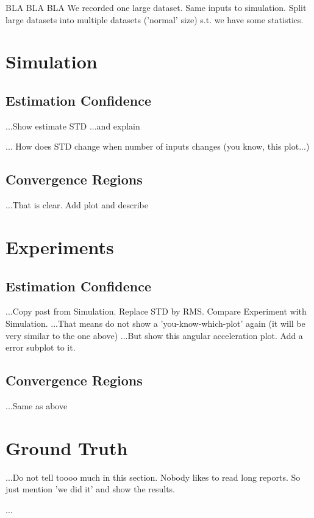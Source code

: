 BLA BLA BLA
We recorded one large dataset.
Same inputs to simulation.
Split large datasets into multiple datasets ('normal' size) s.t. we have some statistics.

\section{Simulation}
\subsection{Estimation Confidence}
...Show estimate STD
...and explain

... How does STD change when number of inputs changes (you know, this plot...)

\subsection{Convergence Regions}
...That is clear. Add plot and describe

\section{Experiments}
\subsection{Estimation Confidence}
...Copy past from Simulation. Replace STD by RMS. Compare Experiment with Simulation.
...That means do not show a 'you-know-which-plot' again (it will be very similar to the one above)
...But show this angular acceleration plot. Add a error subplot to it.
\subsection{Convergence Regions}
...Same as above
\section{Ground Truth}
...Do not tell toooo much in this section. Nobody likes to read long reports. So just mention 'we did it' and show the results.

...
